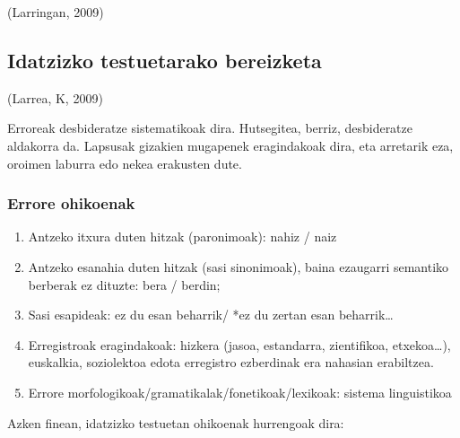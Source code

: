 \documentclass[
]{book}
\providecommand{\tightlist}{%
  \setlength{\itemsep}{0pt}\setlength{\parskip}{0pt}}
\begin{document}
(Larringan, 2009)

\hypertarget{idatzizko-testuetarako-bereizketa}{%
\subsection{Idatzizko testuetarako bereizketa}\label{idatzizko-testuetarako-bereizketa}}

(Larrea, K, 2009)

Erroreak desbideratze sistematikoak dira.
Hutsegitea, berriz, desbideratze aldakorra da.
Lapsusak gizakien mugapenek eragindakoak dira, eta arretarik eza, oroimen laburra edo nekea erakusten dute.

\hypertarget{errore-ohikoenak}{%
\subsubsection{Errore ohikoenak}\label{errore-ohikoenak}}

\begin{enumerate}
\def\labelenumi{\alph{enumi})}
\tightlist
\item
  Antzeko itxura duten hitzak (paronimoak): nahiz / naiz
\item
  Antzeko esanahia duten hitzak (sasi sinonimoak), baina ezaugarri semantiko berberak ez dituzte: bera / berdin;
\item
  Sasi esapideak: ez du esan beharrik/ *ez du zertan esan beharrik\ldots{}
\item
  Erregistroak eragindakoak: hizkera (jasoa, estandarra, zientifikoa, etxekoa\ldots), euskalkia, soziolektoa edota erregistro ezberdinak era nahasian erabiltzea.
\item
  Errore morfologikoak/gramatikalak/fonetikoak/lexikoak: sistema linguistikoa
\end{enumerate}

Azken finean, idatzizko testuetan ohikoenak hurrengoak dira:
\end{document}
